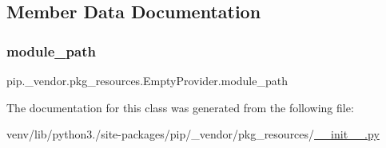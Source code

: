 \subsection{Member Data Documentation}
\mbox{\label{classpip_1_1__vendor_1_1pkg__resources_1_1EmptyProvider_a4fe1254c2b8db26e696e6bfd46174e8a}} 
\subsubsection{\texorpdfstring{module\+\_\+path}{module\_path}}
{\footnotesize\ttfamily pip.\+\_\+vendor.\+pkg\+\_\+resources.\+Empty\+Provider.\+module\+\_\+path\hspace{0.3cm}{\ttfamily [static]}}



The documentation for this class was generated from the following file\+:\begin{DoxyCompactItemize}
\item 
venv/lib/python3./site-\/packages/pip/\+\_\+vendor/pkg\+\_\+resources/\hyperlink{venv_2lib_2python3_89_2site-packages_2pip_2__vendor_2pkg__resources_2____init_____8py}{\+\_\+\+\_\+init\+\_\+\+\_\+.\+py}\end{DoxyCompactItemize}
